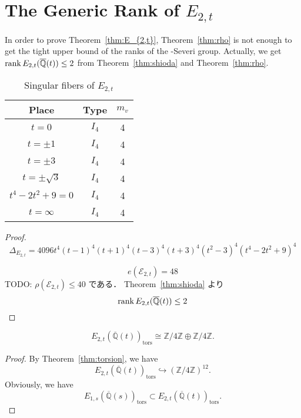 \documentclass[main]{subfiles}
\begin{document}
\chapter{The Generic Rank of $E_{2,t}$}

In order to prove Theorem~\ref{thm:E_{2,t}}, Theorem~\ref{thm:rho} is not enough to get the tight upper bound of the ranks of the \Neron-Severi group.
Actually, we get $\operatorname{rank} E_{2,t}(\overline{\mathbb{Q}}(t)) \leq 2$ from Theorem~\ref{thm:shioda} and Theorem~\ref{thm:rho}.
\begin{table}[h]
    \centering
    \caption{Singular fibers of $E_{2,t}$}
    \begin{tabular}{|c|c|c|}
        \hline
        Place            & Type  & $m_v$ \\
        \hline
        $t=0$            & $I_4$ & 4     \\
        $t=\pm 1$        & $I_4$ & 4     \\
        $t=\pm 3$        & $I_4$ & 4     \\
        $t=\pm \sqrt{3}$ & $I_4$ & 4     \\
        $t^4-2t^2+9=0$   & $I_4$ & 4     \\
        $t=\infty$       & $I_4$ & 4     \\
        \hline
    \end{tabular}
\end{table}
\begin{proof}
    \begin{equation}
        \Delta_{E_{2,t}} = 4096t^{4}(t - 1)^{4}(t + 1)^{4}(t - 3)^{4}(t + 3)^{4}(t^{2} - 3)^{4}(t^{4} - 2t^{2} + 9)^{4}
    \end{equation}

    \begin{equation}
        e(\mathcal{E}_{2,t}) = 48
    \end{equation}
    TODO: $\rho(\mathcal{E}_{2,t}) \leq 40$ である．
    Theorem~\ref{thm:shioda} より
    \begin{equation}
        \operatorname{rank} E_{2,t}(\overline{\mathbb{Q}}(t)) \leq 2
    \end{equation}
\end{proof}

\begin{lem}
    \begin{equation}
        E_{2,t}(\overline{\mathbb{Q}}(t))_{\text{tors}} \cong \mathbb{Z} / 4 \mathbb{Z} \oplus \mathbb{Z} / 4 \mathbb{Z}.
    \end{equation}
\end{lem}
\begin{proof}
    By Theorem~\ref{thm:torsion}, we have
    \begin{equation}
        E_{2,t}(\overline{\mathbb{Q}}(t))_{\text{tors}} \hookrightarrow (\mathbb{Z} / 4 \mathbb{Z})^{12}.
    \end{equation}
    Obviously, we have
    \begin{equation}
        E_{1,s}(\overline{\mathbb{Q}}(s))_{\text{tors}} \subset E_{2,t}(\overline{\mathbb{Q}}(t))_{\text{tors}}.
    \end{equation}
\end{proof}
\end{document}
